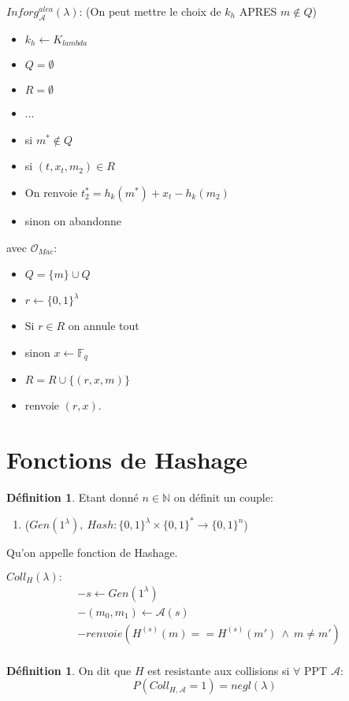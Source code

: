 \documentclass[12pt]{article}
\theoremstyle{plain}
\theoremstyle{definition}
\newtheorem{defn}[subsubsection]{D\'efinition}
\theoremstyle{remark}
\newcommand{\A}{\mathcal{A}}
\newcommand{\N}{\mathbb{N}}
\newcommand{\Or}{\mathcal{O}}
\begin{document}
$Inforg_{\A}^{alea}(\lambda)$: (On peut mettre le choix de $k_h$ APRES $m\notin Q$)
\begin{itemize}
    \item $k_h\leftarrow K_{lambda}$
    \item $Q=\emptyset$
    \item $R=\emptyset$
    \item ...
    \item si $m^*\notin Q$
    \item si $(t, x_t, m_2)\in R$
    \item On renvoie $t_2^*=h_k(m^*)+x_t-h_k(m_2)$
    \item sinon on abandonne
\end{itemize}
avec $\Or_{Mac}$:
\begin{itemize}
    \item $Q=\{m\}\cup Q$
    \item $r\leftarrow\{0,1\}^{\lambda}$
    \item Si $r\in R$ on annule tout
    \item sinon $x\leftarrow \mathbb{F}_q$
    \item $R=R\cup\{(r,x,m)\}$
    \item renvoie $(r,x)$.
\end{itemize}


\newpage
\section{Fonctions de Hashage}

\begin{defn}
    Etant donné $n\in\N$ on définit un couple:
    \begin{enumerate}
        \item ($Gen(1^{\lambda}),~Hash:\{0,1\}^{\lambda}
        \times \{0,1\}^*
        \rightarrow \{0,1\}^n$)
    \end{enumerate}
    Qu'on appelle fonction de Hashage.
\end{defn}

$Coll_H(\lambda):$
    \begin{align*}
        &-s\leftarrow Gen(1^{\lambda})\\
        &-(m_0,m_1)\leftarrow \A(s)\\
        &-renvoie (H^{(s)}(m)==H^{(s)}(m')~\wedge~ m\ne m')\\
    \end{align*}

\begin{defn}
    On dit que $H$ est resistante aux collisions si $\forall$
     PPT $\A$: \[P(Coll_{H,\A}=1)=negl(\lambda)\]
\end{defn}
\end{document}
